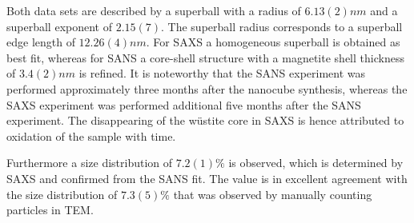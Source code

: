 \documentclass[\main/dresen_thesis.tex]{subfiles}
\begin{document}
  Both data sets are described by a superball with a radius of $6.13(2) \unit{nm}$ and a superball exponent of $2.15(7)$.
  The superball radius corresponds to a superball edge length of $12.26(4) \unit{nm}$.
  For SAXS a homogeneous superball is obtained as best fit, whereas for SANS a core-shell structure with a magnetite shell thickness of $3.4(2) \unit{nm}$ is refined.
  It is noteworthy that the SANS experiment was performed approximately three months after the nanocube synthesis, whereas the SAXS experiment was performed additional five months after the SANS experiment.
  The disappearing of the w\"ustite core in SAXS is hence attributed to oxidation of the sample with time.

  Furthermore a size distribution of $7.2(1) \%$ is observed, which is determined by SAXS and confirmed from the SANS fit.
  The value is in excellent agreement with the size distribution of $7.3(5) \%$ that was observed by manually counting particles in TEM.
\end{document}
